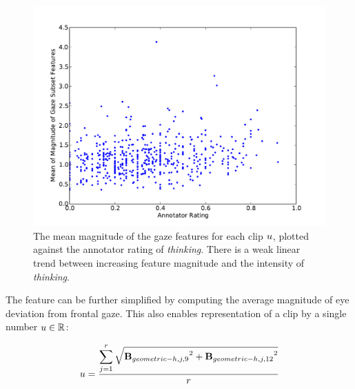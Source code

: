\begin{figure}[tb]
\centering
\includegraphics[width = 0.7 \columnwidth]{nvcclass/ThinkingGazeMean.pdf}
\caption[The mean magnitude of the gaze features for each clip $\clipFeatureDigestVal$, plotted against the annotator rating of \textit{thinking}.]{The mean magnitude of the gaze features for each clip $\clipFeatureDigestVal$, plotted against the annotator rating of \textit{thinking}. There is a weak linear trend between increasing feature magnitude and the intensity of \textit{thinking}.}
\label{FigureThinkingMeanScatter}
\end{figure}


The feature can be further simplified by computing the average magnitude of eye deviation from frontal gaze. This also enables representation of a clip by a single number $u \in \mathbb{R}$:

\begin{gather}
\clipFeatureDigestVal = %
\frac{\displaystyle\sum\limits_{j=1}^{\numClipFrames} \sqrt{{\clipFeature_{geometric-h,j,9}}^2 + {\clipFeature_{geometric-h,j,12}}^2}}
{\numClipFrames}
\end{gather}


